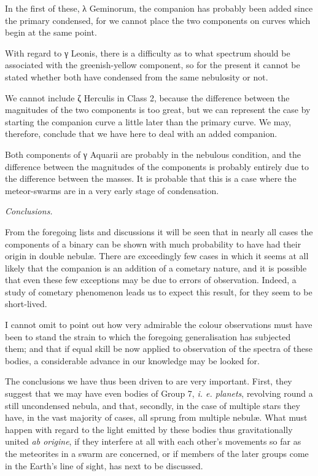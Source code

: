 \documentclass[a4paper, 12pt, oneside, polutonikogreek, english]{article}
\begin{document}
In the first of these, λ Geminorum, the companion has probably been added since the primary condensed, for we cannot place the two components on curves which begin at the same point.

With regard to γ Leonis, there is a difficulty as to what spectrum should be associated with the greenish-yellow component, so for the present it cannot be stated whether both have condensed from the same nebulosity or not.

We cannot include ζ Herculis in Class 2, because the difference between the magnitudes of the two components is too great, but we can represent the case by starting the companion curve a little later than the primary curve. We may, therefore, conclude that we have here to deal with an added companion.

Both components of γ Aquarii are probably in the nebulous condition, and the difference between the magnitudes of the components is probably entirely due to the difference between the masses. It is probable that this is a case where the meteor-swarms are in a very early stage of condensation.

\emph{Conclusions.}

From the foregoing lists and discussions it will be seen that in nearly all cases the components of a binary can be shown with much probability to have had their origin in double nebulæ. There are exceedingly few cases in which it seems at all likely that the companion is an addition of a cometary nature, and it is possible that even these few exceptions may be due to errors of observation. Indeed, a study of cometary phenomenon leads us to expect this result, for they seem to be short-lived.

I cannot omit to point out how very admirable the colour observations must have been to stand the strain to which the foregoing generalisation has subjected them; and that if equal skill be now applied to observation of the spectra of these bodies, a considerable advance in our knowledge may be looked for.

The conclusions we have thus been driven to are very important. First, they suggest that we may have even bodies of Group 7, \emph{i. e. planets}, revolving round a still uncondensed nebula, and that, secondly, in the case of multiple stars they have, in the vast majority of cases, all sprung from multiple nebulæ. What must happen with regard to the light emitted by these bodies thus gravitationally united \emph{ab origine}, if they interfere at all with each other's movements so far as the meteorites in a swarm are concerned, or if members of the later groups come in the Earth's line of sight, has next to be discussed.
\clearpage
\end{document}
